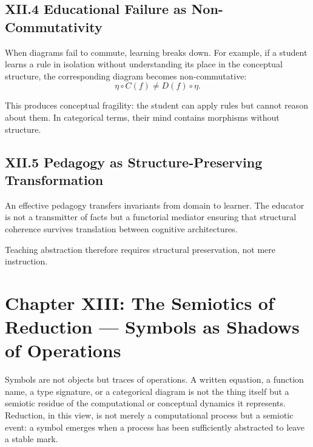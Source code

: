 \documentclass[12pt,letterpaper]{article}
\begin{document}
\subsection{XII.4 Educational Failure as Non-Commutativity}

When diagrams fail to commute, learning breaks down. For example, if a student learns a rule in isolation without understanding its place in the conceptual structure, the corresponding diagram becomes non-commutative:
\[
\eta \circ C(f) \neq D(f) \circ \eta.
\]

This produces conceptual fragility: the student can apply rules but cannot reason about them. In categorical terms, their mind contains morphisms without structure.

\subsection{XII.5 Pedagogy as Structure-Preserving Transformation}

An effective pedagogy transfers invariants from domain to learner. The educator is not a transmitter of facts but a functorial mediator ensuring that structural coherence survives translation between cognitive architectures.

Teaching abstraction therefore requires structural preservation, not mere instruction.

\newpage

\section{Chapter XIII: The Semiotics of Reduction — Symbols as Shadows of Operations}

Symbols are not objects but traces of operations. A written equation, a function name, a type signature, or a categorical diagram is not the thing itself but a semiotic residue of the computational or conceptual dynamics it represents. Reduction, in this view, is not merely a computational process but a semiotic event: a symbol emerges when a process has been sufficiently abstracted to leave a stable mark.

\end{document}
